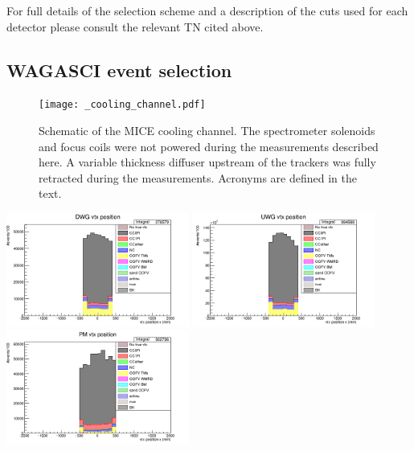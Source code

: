 \documentclass[%
 reprint,
 amsmath,amssymb,
 aps,
]{revtex4-2}
\begin{document}
For full details of the selection scheme and a description of the cuts used for each detector please consult the relevant TN cited above.

\subsection{WAGASCI event selection}
\begin{figure}[htbp]
\begin{center}
\texttt{[image: \_cooling\_channel.pdf]}
\end{center}
\caption{Schematic of the MICE cooling channel. The spectrometer solenoids and focus coils were not powered during the measurements described here. A variable thickness diffuser upstream of the trackers was fully retracted during the measurements. Acronyms are defined in the text.}
\label{fig:micecc}
\end{figure}
    \includegraphics[width=0.45\textwidth]{images/vtx_reco_pos[0]_wgbm_topo_DWG_accum_level[][26]_data_mc.png}
    \includegraphics[width=0.45\textwidth]{images/vtx_reco_pos[0]_wgbm_topo_UWG_accum_level[][16]_data_mc.png}
    \includegraphics[width=0.45\textwidth]{images/vtx_reco_pos[0]_wgbm_topo_PM_accum_level[][06]_data_mc.png}
\end{document}
